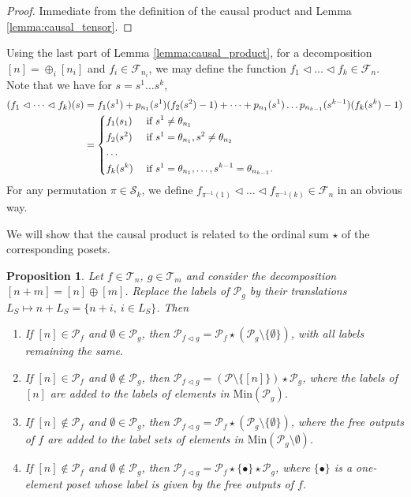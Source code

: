 \documentclass[12pt]{article}
\newtheorem{prop}{Proposition}
\theoremstyle{definition}
\theoremstyle{remark}
\def\Te{\mathcal T}
\def\Fe{\mathcal F}
\def\Pe{\mathcal P}
\def\permut{\mathscr{S}}
\def\vtl{\vartriangleleft}
\begin{document}
\begin{proof}
Immediate from the definition of the causal product and Lemma \ref{lemma:causal_tensor}.

\end{proof}







Using the last part of Lemma \ref{lemma:causal_product},
for a decomposition $[n]=\oplus_i[n_i]$ and $f_i\in \Fe_{n_i}$,  we may define the function $f_1\vtl\dots \vtl f_k\in
\Fe_{n}$. Note that we have for $s=s^1\dots s^k$, 
\begin{align*}
(f_1\vtl \dots\vtl f_k)(s)&=f_1(s^1)+p_{n_1}(s^1)(f_2(s^2)-1)+\dots + p_{n_1}(s^1)\dots
p_{n_{k-1}}(s^{k-1})(f_k(s^k)-1)\\
&= \begin{dcases} f_1(s_1) & \text{ if } s^1\ne \theta_{n_1}\\
f_2(s^2) & \text{ if } s^1=\theta_{n_1}, s^2\ne \theta_{n_2}\\
\dots & \\
f_k(s^k) & \text{ if } s^1=\theta_{n_1},\dots,  s^{k-1}=\theta_{n_{k-1}}.
\end{dcases}
\end{align*}
For any permutation $\pi\in \permut_k$, we define  $f_{\pi^{-1}(1)}\vtl \dots \vtl
f_{\pi^{-1}(k)}\in \Fe_n$ in an obvious way.


We will show that the causal product is related to the ordinal sum $\star$ of the corresponding
posets.

\begin{prop}\label{prop:vtl_ordinal} Let $f\in \Te_{n}$, $g\in \Te_{m}$
and
consider the decomposition $[n+m]=[n]\oplus[m]$. Replace the labels of $\Pe_g$ by their
translations $L_S\mapsto n+L_S=\{n+i,\ i\in L_S\}$.
Then  
\begin{enumerate}
\item[(a)] If $[n]\in \Pe_f$ and $\emptyset \in \Pe_g$, then $\Pe_{f\vtl g}=\Pe_f\star
(\Pe_g\setminus\{\emptyset\})$, with all labels remaining the same.
\item[(b)] If $[n]\in \Pe_f$ and $\emptyset \notin \Pe_g$, then $\Pe_{f\vtl
g}=(\Pe\setminus \{[n]\})\star \Pe_g$, where the labels of $[n]$ are added to the
labels of elements in $\mathrm{Min}(\Pe_g)$.
\item[(c)] If $[n]\notin \Pe_f$ and $\emptyset \in \Pe_g$, then $\Pe_{f\vtl g}=\Pe_f\star
(\Pe_g\setminus\{\emptyset\})$, where the free outputs  of $f$ are added to the label sets
of elements in $\mathrm{Min}(\Pe_g\setminus \emptyset)$.
\item[(d)] If $[n]\notin \Pe_f$ and $\emptyset \notin \Pe_g$, then $\Pe_{f\vtl
g}=\Pe_f\star \{\bullet\}\star \Pe_g$, where $\{\bullet\}$ is a one-element poset whose
label is given by the free outputs of $f$.

\end{enumerate}

\end{prop}
\end{document}
